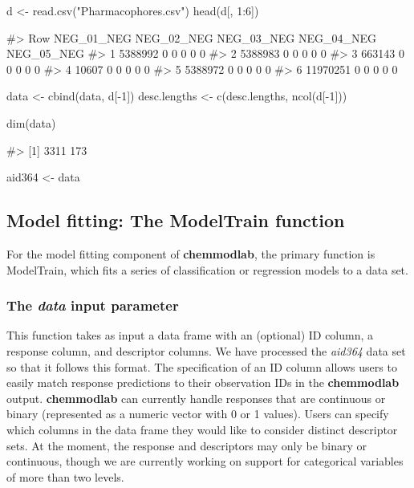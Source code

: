 \begin{Schunk}
\begin{Sinput}
d <- read.csv("Pharmacophores.csv")
head(d[, 1:6])
\end{Sinput}
\begin{Soutput}
#>        Row NEG_01_NEG NEG_02_NEG NEG_03_NEG NEG_04_NEG NEG_05_NEG
#> 1  5388992          0          0          0          0          0
#> 2  5388983          0          0          0          0          0
#> 3   663143          0          0          0          0          0
#> 4    10607          0          0          0          0          0
#> 5  5388972          0          0          0          0          0
#> 6 11970251          0          0          0          0          0
\end{Soutput}
\begin{Sinput}
data <- cbind(data, d[-1])
desc.lengths <- c(desc.lengths, ncol(d[-1]))

dim(data)
\end{Sinput}
\begin{Soutput}
#> [1] 3311  173
\end{Soutput}
\begin{Sinput}
aid364 <- data
\end{Sinput}
\end{Schunk}

\subsection{\texorpdfstring{Model fitting: The \textbf{ModelTrain}
function}{Model fitting: The ModelTrain function}}\label{model-fitting-the-modeltrain-function}

For the model fitting component of \textbf{chemmodlab}, the primary
function is ModelTrain, which fits a series of classification or
regression models to a data set.

\subsubsection{\texorpdfstring{The \textit{data} input
parameter}{The  input parameter}}\label{the-input-parameter}

This function takes as input a data frame with an (optional) ID column,
a response column, and descriptor columns. We have processed the
\emph{aid364} data set so that it follows this format. The specification
of an ID column allows users to easily match response predictions to
their observation IDs in the \textbf{chemmodlab} output.
\textbf{chemmodlab} can currently handle responses that are continuous
or binary (represented as a numeric vector with 0 or 1 values). Users
can specify which columns in the data frame they would like to consider
distinct descriptor sets. At the moment, the response and descriptors
may only be binary or continuous, though we are currently working on
support for categorical variables of more than two levels.

